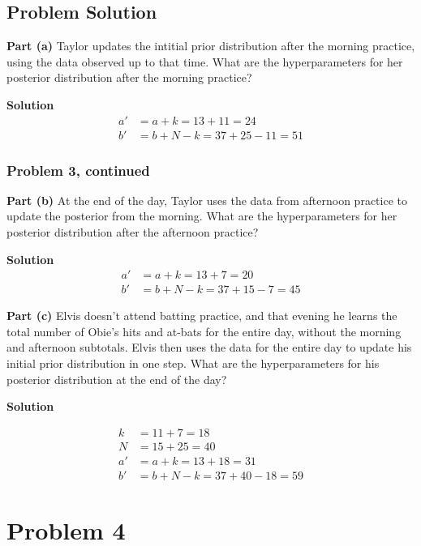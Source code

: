 \documentclass[12pt]{article}
\theoremstyle{definition}
\begin{document}
\subsection*{Problem Solution}

\noindent
{\bf Part (a)} Taylor updates the intitial prior distribution after the morning practice, using the data observed up to that time. What are the hyperparameters for her posterior distribution after the morning practice?


\bigskip
\noindent
{\bf Solution} 
\begin{align*}
a' &= a + k = 13 + 11 = 24\\
b' &= b + N - k = 37 + 25 - 11 = 51
\end{align*}

\newpage
\subsubsection*{Problem 3, continued}

\noindent
{\bf Part (b)} At the end of the day, Taylor uses the data from afternoon practice to update the posterior from the morning. What are the hyperparameters for her posterior distribution after the afternoon practice?

\noindent
{\bf Solution} 
\begin{align*}
a' &= a + k = 13 + 7 = 20\\
b' &= b + N - k = 37 + 15 - 7 = 45
\end{align*}


\noindent
{\bf Part (c)} Elvis doesn't attend batting practice, and that evening he learns the total number of Obie's hits and at-bats for the entire day, without the morning and afternoon subtotals. Elvis then uses the data for the entire day to update his initial prior distribution in one step. What are the hyperparameters for his posterior distribution at the end of the day?

\bigskip
\noindent
{\bf Solution} 

\begin{align*}
k &= 11 + 7 = 18\\
N &= 15 + 25 = 40\\
a' &= a + k = 13 + 18 = 31\\
b' &= b + N - k = 37 + 40 - 18 = 59
\end{align*}





\newpage
\section*{Problem 4}
\end{document}
